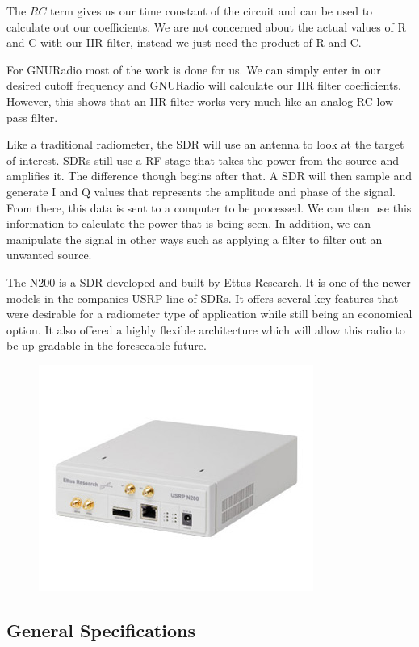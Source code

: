 The $RC$ term gives us our time constant of the circuit and can be used to calculate out our coefficients.  We are not concerned about the actual values of R and C with our IIR filter, instead we just need the product of R and C.  

For GNURadio most of the work is done for us.  We can simply enter in our desired cutoff frequency and GNURadio will calculate our IIR filter coefficients.  However, this shows that an IIR filter works very much like an analog RC low pass filter.

Like a traditional radiometer, the SDR will use an antenna to look at the target of interest.  SDRs still use a RF stage that takes the power from the source and amplifies it.  The difference though begins after that.  A SDR will then sample and generate I and Q values that represents the amplitude and phase of the signal.  From there, this data is sent to a computer to be processed.  We can then use this information to calculate the power that is being seen.  In addition, we can manipulate the signal in other ways such as applying a filter to filter out an unwanted source.


The N200 is a SDR developed and built by Ettus Research.  It is one of the newer models in the companies USRP line of SDRs.  It offers several key features that were desirable for a radiometer type of application while still being an economical option.  It also offered a highly flexible architecture which will allow this radio to be up-gradable in the foreseeable future.  

{\begin{figure}[h!tb] 
\centering
\includegraphics{Images/n200}
\label{N200}
\end{figure}
}
\subsection{General Specifications}

